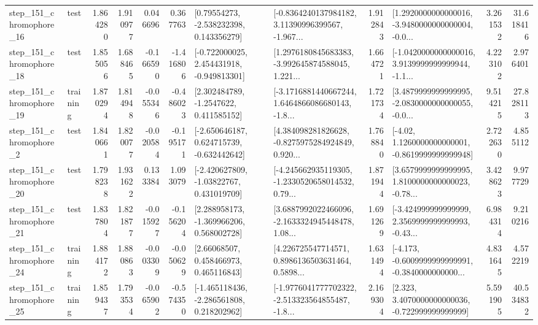 \begin{tabular}{llrrrrllrlrr}
  step\_151\_chromophore\_16 &      test &      1.864280 &    1.910977 &      0.046696 &  0.367763 &     [0.79554273, -2.538232398, 0.143356279] &  [-0.8364240137984182, 3.11390996399567, -1.967... &       1.912843 &  [1.2920000000000016, -3.9480000000000004, -0.0... &            3.261532 &         31.618416 \\
  step\_151\_chromophore\_18 &      test &      1.855056 &    1.688465 &     -0.166590 & -1.416806 &   [-0.722000025, 2.454431918, -0.949813301] &  [1.2976180845683383, -3.992645874588045, 1.221... &       1.664721 &  [-1.0420000000000016, 3.9139999999999944, -1.1... &            4.223102 &          2.976401 \\
  step\_151\_chromophore\_19 &  training &      1.870294 &    1.814948 &     -0.055346 & -0.486023 &      [2.302484789, -1.2547622, 0.411585152] &  [-3.1716881440667244, 1.6464866086680143, -1.8... &       1.721734 &  [3.4879999999999995, -2.0830000000000055, -0.0... &            9.514215 &         27.828113 \\
   step\_151\_chromophore\_2 &      test &      1.840661 &    1.820077 &     -0.020584 & -0.195171 &   [-2.650646187, 0.624715739, -0.632442642] &  [4.384098281826628, -0.8275975284924849, 0.920... &       1.768840 &   [-4.02, 1.1260000000000001, -0.8619999999999948] &            2.722630 &          4.855112 \\
  step\_151\_chromophore\_20 &      test &      1.798238 &    1.931622 &      0.133384 &  1.093079 &    [-2.420627809, -1.03822767, 0.431019709] &  [-4.245662935119305, -1.2330520658014532, 0.79... &       1.871944 &  [3.6579999999999995, 1.8100000000000023, -0.78... &            3.428623 &          9.977729 \\
  step\_151\_chromophore\_21 &      test &      1.837804 &    1.821877 &     -0.015927 & -0.156204 &    [2.288958173, -1.369966206, 0.568002728] &  [3.6887992022466096, -2.1633324945448478, 1.08... &       1.691269 &  [-3.424999999999999, 2.3569999999999993, -0.43... &            6.984314 &          9.210216 \\
  step\_151\_chromophore\_24 &  training &      1.884172 &    1.880863 &     -0.003309 & -0.050629 &      [2.66068507, 0.458466973, 0.465116843] &  [4.226725547714571, 0.8986136503631464, 0.5898... &       1.631494 &  [-4.173, -0.6009999999999991, -0.3840000000000... &            4.831645 &          4.572219 \\
  step\_151\_chromophore\_25 &  training &      1.859437 &    1.793534 &     -0.065902 & -0.574350 &   [-1.465118436, -2.286561808, 0.218202962] &  [-1.9776041777702322, -2.513323564855487, -1.8... &       2.169304 &    [2.323, 3.4070000000000036, -0.722999999999999] &            5.591905 &         40.534832 \\

\end{tabular}
